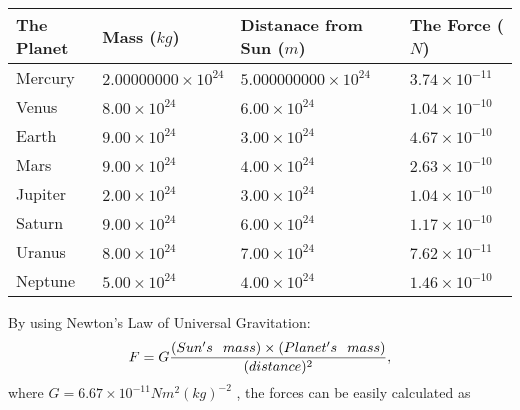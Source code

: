 \documentclass[12pt]{article}
\begin{document}
 
\begin{tabular}{|l|l|l|l|}
\hline
The Planet & Mass ($kg$) & Distanace from Sun ($m$) & The Force ($N$)\\
\hline
Mercury  &
           $ %
2.00000000 \times 10^{24} $   &
             $ %
5.000000000 \times 10^{24} $    & $ %
3.74 \times 10^{-11} $
\\  \hline
Venus    &
           $  %
8.00 \times 10^{24}  $     &
             $ %
6.00 \times 10^{24} $    & $ %
1.04 \times 10^{-10} $
\\  \hline
Earth    &
           $  %
9.00 \times 10^{24}  $     &
             $ %
3.00 \times 10^{24} $    & $ %
4.67 \times 10^{-10} $
\\   \hline
Mars     &
           $  %
9.00 \times 10^{24} $     &
             $ %
4.00 \times 10^{24} $    & $ %
2.63 \times 10^{-10} $
\\   \hline
Jupiter  &
           $  %
2.00 \times 10^{24} $    &
             $ %
3.00 \times 10^{24} $    & $ %
1.04 \times 10^{-10} $
\\  \hline
Saturn   &
           $  %
9.00 \times 10^{24} $    &
             $ %
6.00 \times 10^{24}  $    & $ %
1.17 \times 10^{-10} $
\\  \hline
Uranus   &
           $  %
8.00 \times 10^{24} $    &
             $ %
7.00 \times 10^{24} $    & $ %
7.62 \times 10^{-11} $
\\  \hline
Neptune  &
           $  %
5.00 \times 10^{24} $    &
             $ %
4.00 \times 10^{24} $    & $ %
1.46 \times 10^{-10} $
\\  \hline
 
\end{tabular}
 
 
 
 
\noindent{}
 
 

 
 
 
 
\noindent{}
 
 

By using Newton's Law of Universal Gravitation:
\[
F=G \frac{(Sun's \hspace{0.1in} mass) \times (Planet's \hspace{0.1in} mass)} { (distance)^2},
\]
where
$ G= %
6.67 \times 10^{-11} N m^{2}(kg)^{-2}$ , the forces can be easily calculated as
 
\end{document}
